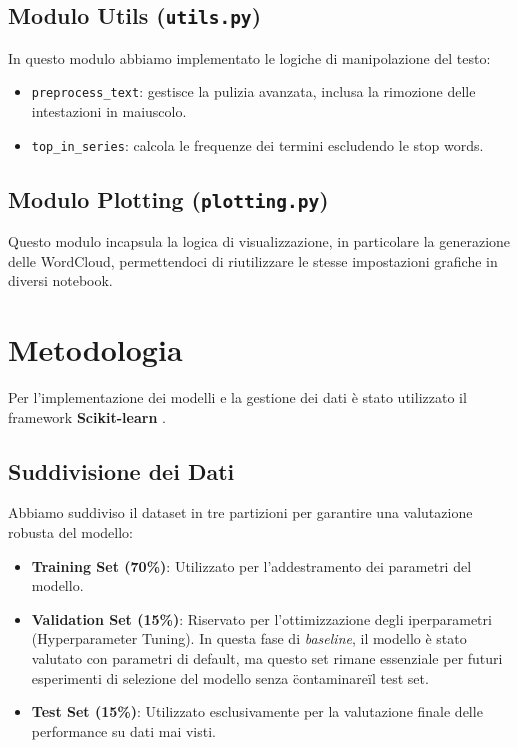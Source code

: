 \documentclass[a4paper,12pt]{article}
\begin{document}
\subsection{Modulo Utils (\texttt{utils.py})}
In questo modulo abbiamo implementato le logiche di manipolazione del testo:
\begin{itemize}
    \item \texttt{preprocess\_text}: gestisce la pulizia avanzata, inclusa la rimozione delle intestazioni in maiuscolo.
    \item \texttt{top\_in\_series}: calcola le frequenze dei termini escludendo le stop words.
\end{itemize}

\subsection{Modulo Plotting (\texttt{plotting.py})}
Questo modulo incapsula la logica di visualizzazione, in particolare la generazione delle WordCloud, permettendoci di riutilizzare le stesse impostazioni grafiche in diversi notebook.

\section{Metodologia}
Per l'implementazione dei modelli e la gestione dei dati è stato utilizzato il framework \textbf{Scikit-learn} \cite{sklearn}.

\subsection{Suddivisione dei Dati}
Abbiamo suddiviso il dataset in tre partizioni per garantire una valutazione robusta del modello:
\begin{itemize}
    \item \textbf{Training Set (70\%)}: Utilizzato per l'addestramento dei parametri del modello.
    \item \textbf{Validation Set (15\%)}: Riservato per l'ottimizzazione degli iperparametri (Hyperparameter Tuning). In questa fase di \textit{baseline}, il modello è stato valutato con parametri di default, ma questo set rimane essenziale per futuri esperimenti di selezione del modello senza \"contaminare\" il test set.
    \item \textbf{Test Set (15\%)}: Utilizzato esclusivamente per la valutazione finale delle performance su dati mai visti.
\end{itemize}
\end{document}
